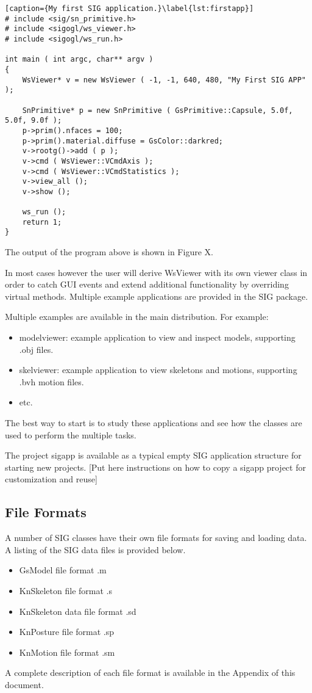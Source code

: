 \begin{lstlisting}[caption={My first SIG application.}\label{lst:firstapp}]
# include <sig/sn_primitive.h>
# include <sigogl/ws_viewer.h>
# include <sigogl/ws_run.h>

int main ( int argc, char** argv )
{
    WsViewer* v = new WsViewer ( -1, -1, 640, 480, "My First SIG APP" );

    SnPrimitive* p = new SnPrimitive ( GsPrimitive::Capsule, 5.0f, 5.0f, 9.0f );
    p->prim().nfaces = 100;
    p->prim().material.diffuse = GsColor::darkred;
    v->rootg()->add ( p );
    v->cmd ( WsViewer::VCmdAxis );
    v->cmd ( WsViewer::VCmdStatistics );
    v->view_all ();
    v->show ();

    ws_run ();
    return 1;
}
\end{lstlisting}

The output of the program above is shown in Figure X.

In most cases however the user will derive WsViewer with its own viewer class in order to catch GUI events and extend additional functionality by overriding virtual methods. Multiple example applications are provided in the SIG package.

Multiple examples are available in the main distribution. For example:
\begin{itemize}
\item modelviewer: example application to view and inspect models, supporting .obj files.
\item skelviewer: example application to view skeletons and motions, supporting .bvh motion files.
\item etc.
\end{itemize}

The best way to start is to study these applications and see how the classes are used to perform the multiple tasks.

The project sigapp is available as a typical empty SIG application structure for starting new projects.
[Put here instructions on how to copy a sigapp project for customization and reuse]

\subsection{File Formats}

A number of SIG classes have their own file formats for saving and loading data. A listing of the SIG data files is provided below.

\begin{itemize}
    \item GsModel file format .m
    \item KnSkeleton file format .s
    \item KnSkeleton data file format .sd
    \item KnPosture file format .sp
    \item KnMotion file format .sm 
\end{itemize}

A complete description of each file format is available in the Appendix of this document.

